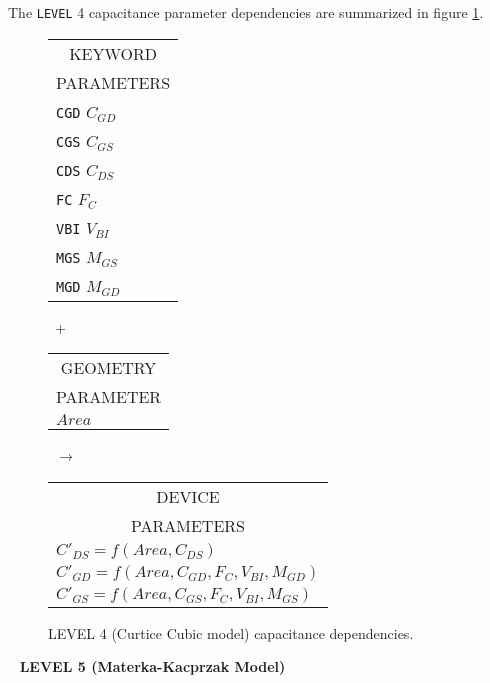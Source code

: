 The {\tt LEVEL} 4 capacitance parameter dependencies are summarized in figure
\ref{blevel4cap}.\\[0.2in]
\begin{figure}[h]
\begin{tabular}[t]{|p{1in}|}
\hline
\multicolumn{1}{|c|}{KEYWORD} \\
\multicolumn{1}{|c|}{PARAMETERS} \\
\hline
\hline
{\tt CGD} \hfill $C_{GD}$\\
{\tt CGS} \hfill $C_{GS}$\\
{\tt CDS} \hfill $C_{DS}$\\
{\tt FC} \hfill $F_C$\\
{\tt VBI} \hfill $V_{BI}$\\
{\tt MGS} \hfill $M_{GS}$\\
{\tt MGD} \hfill $M_{GD}$\\
\hline
\end{tabular}
\hfill
\parbox{0.2in}{\ \vspace*{0.2in}\newline +}
\hfill
\begin{tabular}[t]{|p{1in}|}
\hline
\multicolumn{1}{|c|}{GEOMETRY} \\
\multicolumn{1}{|c|}{PARAMETER} \\
\hline
\hspace*{\fill}$Area$\\
\hline
\end{tabular}
\hfill
\parbox{0.2in}{\ \vspace*{0.2in}\newline $\rightarrow$}
\hfill
\begin{tabular}[t]{|p{1.8in}|}
\hline
\multicolumn{1}{|c|}{DEVICE} \\
\multicolumn{1}{|c|}{PARAMETERS} \\
\hline
$C'_{DS} = f(Area, C_{DS})$\\
$C'_{GD} =$\newline\hspace*{\fill}$ f(Area, C_{GD},F_C,V_{BI},M_{GD})$\\
$C'_{GS} =$\newline\hspace*{\fill}$ f(Area, C_{GS},F_C,V_{BI},M_{GS})$\\
\hline
\end{tabular}
\caption{LEVEL 4 (Curtice Cubic model) capacitance dependencies.
 \label{blevel4cap}}
\end{figure}

\ \myThickLine \label{b:level5:start}
{\bf LEVEL 5
(Materka-Kacprzak Model)}\myline

